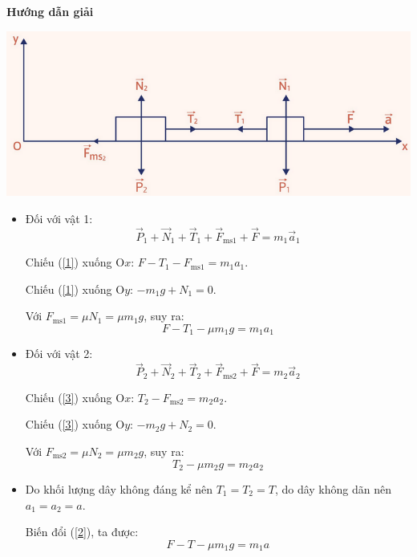 {	\begin{center}
		\textbf{Hướng dẫn giải}
	\end{center}
	\begin{center}
		\includegraphics[scale=0.5]{../figs/G10-17-2}
	\end{center}
	
	\begin{itemize}
		\item Đối với vật 1:
		\begin{equation}\label{1}
			\vec P_1 + \vec N_1 + \vec T_1 + \vec F_\text{ms1} + \vec F = m_1 \vec a_1
		\end{equation}
		
		Chiếu (\ref{1}) xuống O$x$: $F - T_1 - F_\text{ms1} = m_1 a_1$.
		
		Chiếu (\ref{1}) xuống O$y$: $-m_1 g + N_1 = 0$.
		
		Với $F_\text{ms1} = \mu N_1 = \mu m_1 g$, suy ra:
		\begin{equation}\label{2}
			F-T_1 - \mu m_1 g = m_1 a_1
		\end{equation}
		\item Đối với vật 2:
		\begin{equation}\label{3}
			\vec P_2 + \vec N_2 + \vec T_2 + \vec F_\text{ms2} + \vec F = m_2 \vec a_2
		\end{equation}
		
		Chiếu (\ref{3}) xuống O$x$: $T_2 - F_\text{ms2} = m_2 a_2$.
		
		Chiếu (\ref{3}) xuống O$y$: $-m_2 g + N_2 = 0$.
		
		Với $F_\text{ms2} = \mu N_2 = \mu m_2 g$, suy ra:
		\begin{equation}\label{4}
			T_2 - \mu m_2 g = m_2 a_2
		\end{equation}
		
		\item Do khối lượng dây không đáng kể nên $T_1 = T_2 = T$, do dây không dãn nên $a_1 = a_2 = a$.
		
		Biến đổi (\ref{2}), ta được:
		\begin{equation}\label{5}
			F - T - \mu m_1 g = m_1 a
		\end{equation}
		

\end{itemize}}
